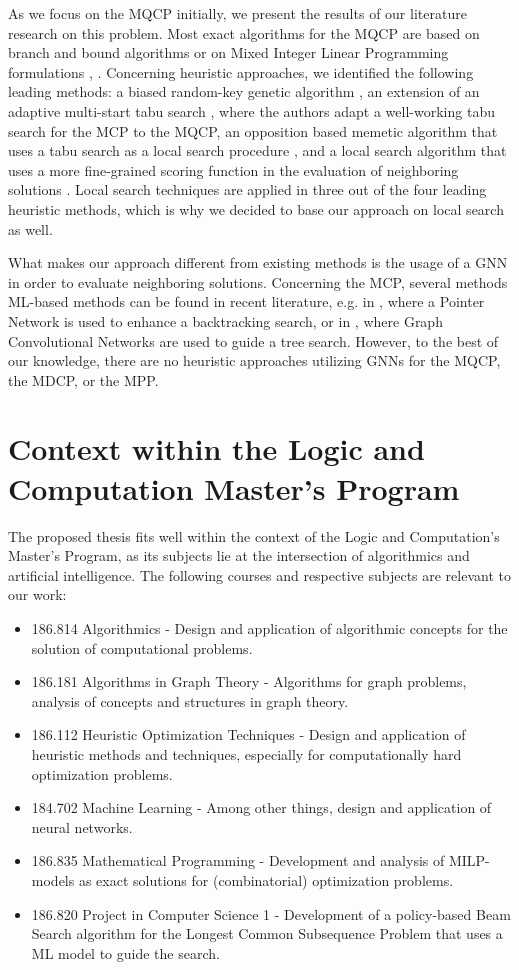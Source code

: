 \documentclass[11pt]{article}
\begin{document}
As we focus on the MQCP initially, we present the results of our literature research on this problem. Most exact algorithms for the MQCP are based on branch and bound algorithms \cite{mahdavi2014branch} or on Mixed Integer Linear Programming formulations \cite{ribeiro_exact_2019}, \cite{Marinelli2021}. Concerning heuristic approaches, we identified the following leading methods: a biased random-key genetic algorithm \cite{pinto_biased_2018}, an extension of an adaptive multi-start tabu search \cite{djeddi_extension_2019}, where the authors adapt a well-working tabu search for the MCP to the MQCP, an opposition based memetic algorithm that uses a tabu search as a local search procedure \cite{zhou_opposition-based_2020}, and a local search algorithm that uses a more fine-grained scoring function in the evaluation of neighboring solutions \cite{chen_nuqclq_2021}. Local search techniques are applied in three out of the four leading heuristic methods, which is why we decided to base our approach on local search as well.  

What makes our approach different from existing methods is the usage of a GNN in order to evaluate neighboring solutions. Concerning the MCP, several methods ML-based methods can be found in recent literature, e.g. in \cite{Gu2020}, where a Pointer Network is used to enhance a backtracking search, or in \cite{Li2018}, where Graph Convolutional Networks are used to guide a tree search. However, to the best of our knowledge, there are no heuristic approaches utilizing GNNs for the MQCP, the MDCP, or the MPP. 

\section{Context within the Logic and Computation Master's Program}

The proposed thesis fits well within the context of the Logic and Computation's Master's Program, as its subjects lie at the intersection of algorithmics and artificial intelligence. The following courses and respective subjects are relevant to our work:
\begin{itemize}
	\item 186.814 Algorithmics - Design and application of algorithmic concepts for the solution of computational problems. 
	\item 186.181 Algorithms in Graph Theory - Algorithms for graph problems, analysis of concepts and structures in graph theory.
	\item 186.112 Heuristic Optimization Techniques - Design and application of heuristic methods and techniques, especially for computationally hard optimization problems.
	\item 184.702 Machine Learning - Among other things, design and application of neural networks.
	\item 186.835 Mathematical Programming - Development and analysis of MILP-models as exact solutions for (combinatorial) optimization problems.
	\item 186.820 Project in Computer Science 1 - Development of a policy-based Beam Search algorithm for the Longest Common Subsequence Problem that uses a ML model to guide the search. 
\end{itemize}

 

\end{document}
